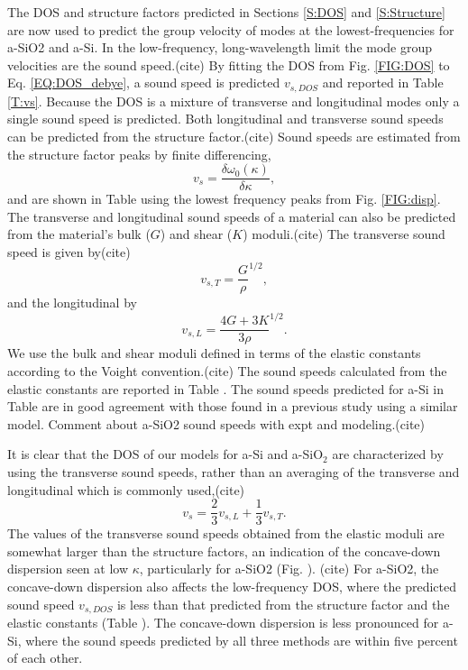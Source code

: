 \documentclass[aps,prb,twocolumn,superscriptaddress,footinbib,amsmath,amssymb,floatfix]{revtex4}
\begin{document}
The DOS and structure factors predicted in Sections \ref{S:DOS} and 
\ref{S:Structure} are now used to 
predict the group velocity of modes at the lowest-frequencies for 
a-SiO2 and a-Si. In the low-frequency, long-wavelength limit the 
mode group velocities are the sound speed.(cite) 
By fitting the DOS 
from Fig. \ref{FIG:DOS} to Eq. \eqref{EQ:DOS_debye}, 
a sound speed is predicted $v_{s,DOS}$ and 
reported in Table \ref{T:vs}. Because the DOS is a mixture of 
transverse and longitudinal modes only a single sound speed is predicted. 
Both longitudinal and transverse sound speeds can be predicted from 
the structure factor.(cite) 
Sound speeds are estimated from the structure factor peaks by finite 
differencing,\begin{equation}\label{EQ:vs_dwdk}
v_{s} = \frac{ \delta \omega_0(\kappa)}{\delta \kappa},
\end{equation}
and are shown in Table using the lowest frequency peaks 
from Fig. \ref{FIG:disp}. 
The transverse and longitudinal sound speeds of a material can 
also be predicted from the material's bulk ($G$) and 
shear ($K$) moduli.(cite) The transverse sound speed is given by(cite)  
\begin{equation}\label{EQ:vs_T_elas}
v_{s,T} = \frac{G}{\rho}^{1/2},
\end{equation}
and the longitudinal by
\begin{equation}\label{EQ:vs_L_elas}
v_{s,L} = \frac{4G + 3K}{3\rho}^{1/2}.
\end{equation}
We use the bulk and shear moduli defined in terms of the elastic 
constants according to the Voight convention.(cite) 
The sound speeds calculated from the 
elastic constants are reported in Table . 
The sound speeds predicted for a-Si in Table are in good agreement 
with those found in a previous study using a similar 
model.\cite{feldman_thermal_1993,feldman_numerical_1999} 
Comment about a-SiO2 sound speeds with expt and modeling.(cite)

It is clear that the DOS of 
our models for a-Si and a-SiO$_2$ are characterized by using the 
transverse sound speeds, rather than an averaging of the transverse 
and longitudinal which is commonly used,(cite)  
\begin{equation}\label{EQ:vs_avg}
v_{s} = \frac{2}{3}v_{s,L} + \frac{1}{3}v_{s,T}. 
\end{equation} 
The values of the transverse sound speeds obtained from the 
elastic moduli are somewhat larger than the structure factors, 
an indication of the concave-down dispersion seen at low 
$\kappa$, particularly for a-SiO2 (Fig. ).
(cite) For a-SiO2, the concave-down dispersion
also affects the low-frequency DOS, where the predicted sound speed 
$v_{s,DOS}$ is less than that predicted from the structure factor 
and the elastic constants (Table ). The concave-down dispersion 
is less pronounced for a-Si, where the sound speeds predicted 
by all three methods are within five percent of each other. 
\end{document}
